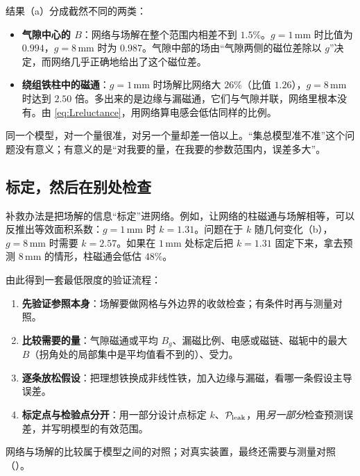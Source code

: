 
结果（a）分成截然不同的两类：
\begin{itemize}
\item \textbf{气隙中心的 $B$}：网络与场解在整个范围内相差不到 $1.5\%$。$g=1\,\mathrm{mm}$ 时比值为 $0.994$，$g=8\,\mathrm{mm}$ 时为 $0.987$。气隙中部的场由“气隙两侧的磁位差除以 $g$”决定，而网络几乎正确地给出了这个磁位差。
\item \textbf{绕组铁柱中的磁通}：$g=1\,\mathrm{mm}$ 时场解比网络大 $26\%$（比值 $1.26$），$g=8\,\mathrm{mm}$ 时达到 $2.50$ 倍。多出来的是边缘与漏磁通，它们与气隙并联，网络里根本没有。由 \eqref{eq:Lreluctance}，用网络算电感会低估同样的比例。
\end{itemize}
同一个模型，对一个量很准，对另一个量却差一倍以上。“集总模型准不准”这个问题没有意义；有意义的是“对我要的量，在我要的参数范围内，误差多大”。

\subsection{标定，然后在别处检查}
补救办法是把场解的信息“标定”进网络。例如，让网络的柱磁通与场解相等，可以反推出等效面积系数：$g=1\,\mathrm{mm}$ 时 $k=1.31$。问题在于 $k$ 随几何变化（b），$g=8\,\mathrm{mm}$ 时需要 $k=2.57$。如果在 $1\,\mathrm{mm}$ 处标定后把 $k=1.31$ 固定下来，拿去预测 $8\,\mathrm{mm}$ 的情形，柱磁通会低估 $48\%$。

由此得到一套最低限度的验证流程：
\begin{enumerate}
\item \textbf{先验证参照本身}：场解要做网格与外边界的收敛检查；有条件时再与测量对照。
\item \textbf{比较需要的量}：气隙磁通或平均 $B_g$、漏磁比例、电感或磁链、磁轭中的最大 $B$（拐角处的局部集中是平均值看不到的）、受力。
\item \textbf{逐条放松假设}：把理想铁换成非线性铁，加入边缘与漏磁，看哪一条假设主导误差。
\item \textbf{标定点与检验点分开}：用一部分设计点标定 $k$、$\mathcal P_{\rm leak}$，用\emph{另一部分}检查预测误差，并写明模型的有效范围。
\end{enumerate}
网络与场解的比较属于模型之间的对照；对真实装置，最终还需要与测量对照（）。

